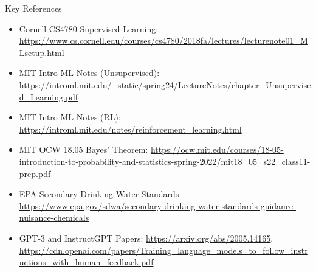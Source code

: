 \documentclass[10pt]{beamer}
\begin{document}
\begin{frame}{Key References}
    \justifying
    \begin{itemize}
        \item Cornell CS4780 Supervised Learning: \url{https://www.cs.cornell.edu/courses/cs4780/2018fa/lectures/lecturenote01_MLsetup.html}
        \item MIT Intro ML Notes (Unsupervised): \url{https://introml.mit.edu/_static/spring24/LectureNotes/chapter_Unsupervised_Learning.pdf}
        \item MIT Intro ML Notes (RL): \url{https://introml.mit.edu/notes/reinforcement_learning.html}
        \item MIT OCW 18.05 Bayes' Theorem: \url{https://ocw.mit.edu/courses/18-05-introduction-to-probability-and-statistics-spring-2022/mit18_05_s22_class11-prep.pdf}
        \item EPA Secondary Drinking Water Standards: \url{https://www.epa.gov/sdwa/secondary-drinking-water-standards-guidance-nuisance-chemicals}
        \item GPT-3 and InstructGPT Papers: \url{https://arxiv.org/abs/2005.14165},
        \url{https://cdn.openai.com/papers/Training_language_models_to_follow_instructions_with_human_feedback.pdf}
    \end{itemize}
\end{frame}
\end{document}
